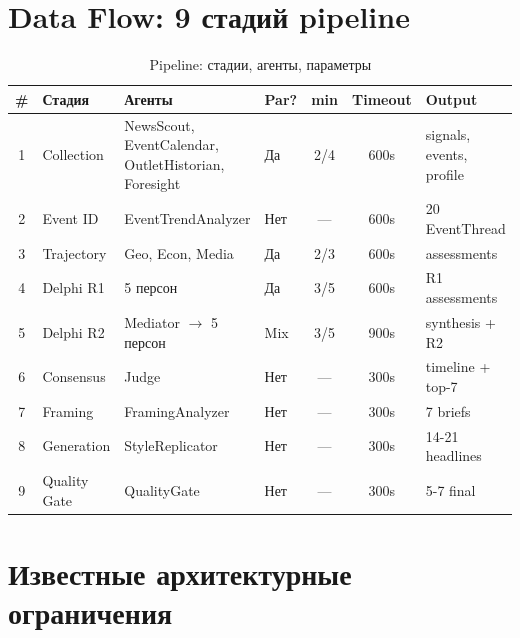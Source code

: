 \documentclass[a4paper, 11pt]{article}
\begin{document}
\begin{appendices}

\section{Data Flow: 9 стадий pipeline}
\label{app:dataflow}

\begin{table}[h]
\centering
\footnotesize
\begin{tabular}{clp{3.5cm}lccl}
\toprule
\textbf{\#} & \textbf{Стадия} & \textbf{Агенты} & \textbf{Par?} & \textbf{min} & \textbf{Timeout} & \textbf{Output} \\
\midrule
1 & Collection      & NewsScout, EventCalendar, OutletHistorian, Foresight & Да & 2/4 & 600s & signals, events, profile \\
2 & Event ID        & EventTrendAnalyzer      & Нет & ---  & 600s & 20 EventThread \\
3 & Trajectory      & Geo, Econ, Media        & Да  & 2/3  & 600s & assessments \\
4 & Delphi R1       & 5 персон                & Да  & 3/5  & 600s & R1 assessments \\
5 & Delphi R2       & Mediator $\to$ 5 персон & Mix & 3/5  & 900s & synthesis + R2 \\
6 & Consensus       & Judge                   & Нет & ---  & 300s & timeline + top-7 \\
7 & Framing         & FramingAnalyzer         & Нет & ---  & 300s & 7 briefs \\
8 & Generation      & StyleReplicator         & Нет & ---  & 300s & 14-21 headlines \\
9 & Quality Gate    & QualityGate             & Нет & ---  & 300s & 5-7 final \\
\bottomrule
\end{tabular}
\caption{Pipeline: стадии, агенты, параметры}
\label{tab:pipeline_stages}
\end{table}



\section{Известные архитектурные ограничения}
\label{app:gotchas}


\end{appendices}
\end{document}
